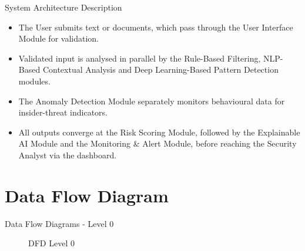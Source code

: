 \documentclass{beamer}
\begin{document}
\begin{frame}{System Architecture Description}
\begin{itemize}
  \item The User submits text or documents, which pass through the User Interface Module for validation.
  \item Validated input is analysed in parallel by the Rule-Based Filtering, NLP-Based Contextual Analysis and Deep Learning-Based Pattern Detection modules.
  \item The Anomaly Detection Module separately monitors behavioural data for insider-threat indicators.
  \item All outputs converge at the Risk Scoring Module, followed by the Explainable AI Module and the Monitoring \& Alert Module, before reaching the Security Analyst via the dashboard.
\end{itemize}
\end{frame}

\section{Data Flow Diagram}
\begin{frame}{Data Flow Diagrams - Level 0}
\begin{figure}
\centering
{}
\caption{DFD Level 0}
\end{figure}
\end{frame}
\end{document}
